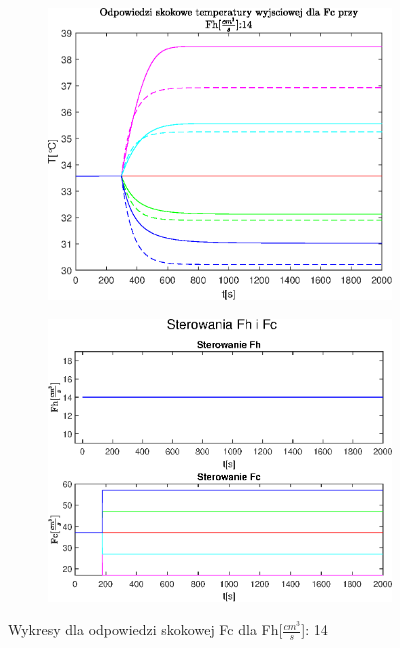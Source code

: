 \begin{figure}[h!]
   \begin{subfigure}[b]{0.6\textwidth}
      \includegraphics[width=1\linewidth]{img/step-responses-fc/stepResponseToutFh.eps}
      \caption{}
      \label{fig:fig:stepResponsesFc143}
   \end{subfigure}
       
   \begin{subfigure}[b]{0.6\textwidth}
      \includegraphics[width=1\linewidth]{img/step-responses-fc/stepResponseUFc.eps}
      \caption{}
      \label{fig:fig:stepResponsesFc144}
   \end{subfigure}
       
   \caption{Wykresy dla odpowiedzi skokowej Fc dla Fh[$\frac{cm^3}{s}$]: 14}
   \label{fig:stepResponsesFc14}
\end{figure}
           
